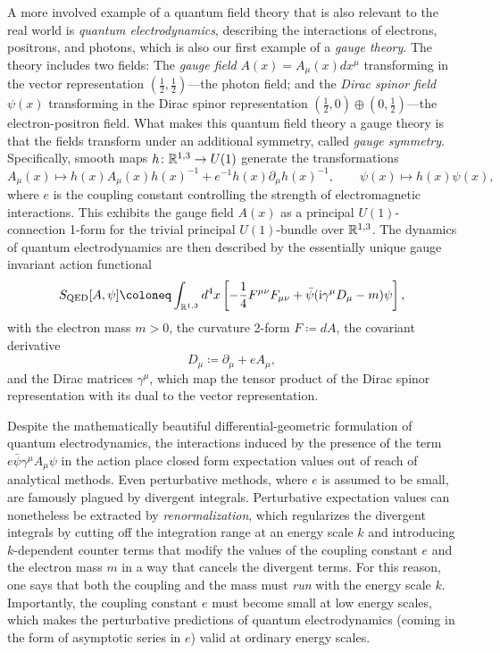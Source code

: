 A more involved example of a quantum field theory that is also relevant to the real world is \emph{quantum electrodynamics}, describing the interactions of electrons, positrons, and photons, which is also our first example of a \emph{gauge theory}. The theory includes two fields: The \emph{gauge field} $A(x) = A_\mu(x) dx^\mu$ transforming in the vector representation $(\tfrac 12, \tfrac 12)$---the photon field; and the \emph{Dirac spinor field} $\psi(x)$ transforming in the Dirac spinor representation $(\tfrac 12,0) \oplus (0,\tfrac 12)$---the electron-positron field. What makes this quantum field theory a gauge theory is that the fields transform under an additional symmetry, called \emph{gauge symmetry}. Specifically, smooth maps $h\colon \mathbb{R}^{1,3} \to U(1)$ generate the transformations
\begin{equation}
	A_\mu(x) \mapsto h(x) A_\mu(x) h(x)^{-1} + e^{-1} h(x) \partial_\mu h(x)^{-1}, \qquad \psi(x) \mapsto h(x) \psi(x),
\end{equation}
where $e$ is the coupling constant controlling the strength of electromagnetic interactions. This exhibits the gauge field $A(x)$ as a principal $U(1)$-connection 1-form for the trivial principal $U(1)$-bundle over $\mathbb{R}^{1,3}$. The dynamics of quantum electrodynamics are then described by the essentially unique gauge invariant action functional
\begin{equation}
	S_\text{QED}[A,\psi] \coloneq \int_{\R^{1,3}} d^4 x \left[ {-\frac{1}{4}} F^{\mu\nu} F_{\mu\nu} + \bar \psi (\I \gamma^\mu D_\mu - m) \psi \right],
\end{equation}
with the electron mass $m > 0$, the curvature 2-form $F \coloneq dA$, the covariant derivative
\begin{equation}
	D_\mu \coloneq \partial_\mu + e A_\mu,
\end{equation}
and the Dirac matrices $\gamma^\mu$, which map the tensor product of the Dirac spinor representation with its dual to the vector representation.

Despite the mathematically beautiful differential-geometric formulation of quantum electrodynamics, the interactions induced by the presence of the term $e \bar \psi \gamma^\mu A_\mu \psi$ in the action place closed form expectation values out of reach of analytical methods. Even perturbative methods, where $e$ is assumed to be small, are famously plagued by divergent integrals. Perturbative expectation values can nonetheless be extracted by \emph{renormalization}, which regularizes the divergent integrals by cutting off the integration range at an energy scale $k$ and introducing $k$-dependent counter terms that modify the values of the coupling constant $e$ and the electron mass $m$ in a way that cancels the divergent terms. For this reason, one says that both the coupling and the mass must \emph{run} with the energy scale $k$. Importantly, the coupling constant $e$ must become small at low energy scales, which makes the perturbative predictions of quantum electrodynamics (coming in the form of asymptotic series in $e$) valid at ordinary energy scales.

